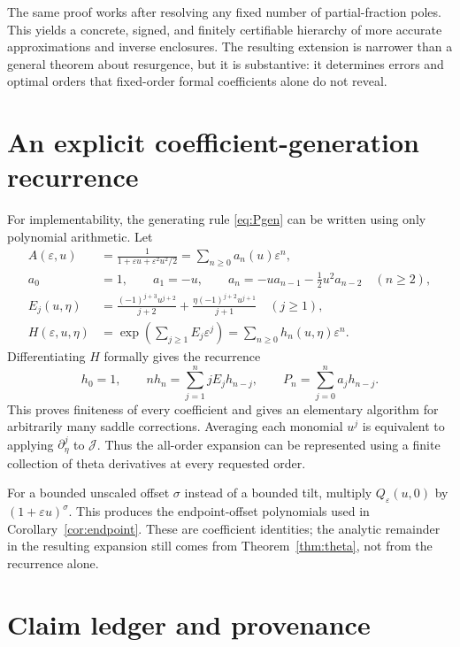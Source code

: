 \documentclass[11pt,a4paper]{article}
\numberwithin{equation}{section}
\theoremstyle{definition}\newtheorem{definition}[theorem]{Definition}
\theoremstyle{remark}\newtheorem{remark}[theorem]{Remark}
\newcommand{\eps}{\varepsilon}
\newcommand{\calJ}{\mathcal J}
\begin{document}
The same proof works after resolving any fixed number of partial-fraction
poles. This yields a concrete, signed, and finitely certifiable hierarchy
of more accurate approximations and inverse enclosures. The resulting
extension is narrower than a general theorem about resurgence, but it is
substantive: it determines errors and optimal orders that fixed-order
formal coefficients alone do not reveal.

\appendix
\section{An explicit coefficient-generation recurrence}
\label{app:recurrence}

For implementability, the generating rule \eqref{eq:Pgen} can be written
using only polynomial arithmetic. Let
\begin{align}
 A(\eps,u)&=\frac1{1+\eps u+\eps^2u^2/2}
             =\sum_{n\ge0}a_n(u)\eps^n,\\
 a_0&=1,\qquad a_1=-u,\qquad
 a_n=-u a_{n-1}-\tfrac12u^2a_{n-2}\quad(n\ge2),\\
 E_j(u,\eta)&=\frac{(-1)^{j+3}u^{j+2}}{j+2}
            +\frac{\eta(-1)^{j+2}u^{j+1}}{j+1}\quad(j\ge1),\\
 H(\eps,u,\eta)&=\exp\left(\sum_{j\ge1}E_j\eps^j\right)
                    =\sum_{n\ge0}h_n(u,\eta)\eps^n.
\end{align}
Differentiating $H$ formally gives the recurrence
\begin{equation}
 h_0=1,\qquad nh_n=\sum_{j=1}^n jE_jh_{n-j},\qquad
 P_n=\sum_{j=0}^n a_jh_{n-j}.
 \label{eq:polyrec}
\end{equation}
This proves finiteness of every coefficient and gives an elementary
algorithm for arbitrarily many saddle corrections. Averaging each
monomial $u^j$ is equivalent to applying $\partial_\eta^j$ to $\calJ$.
Thus the all-order expansion can be represented using a finite collection
of theta derivatives at every requested order.

For a bounded unscaled offset $\sigma$ instead of a bounded tilt, multiply
$Q_\eps(u,0)$ by $(1+\eps u)^\sigma$. This produces the endpoint-offset
polynomials used in Corollary~\ref{cor:endpoint}. These are coefficient
identities; the analytic remainder in the resulting expansion still comes
from Theorem~\ref{thm:theta}, not from the recurrence alone.

\section{Claim ledger and provenance}
\label{app:ledger}
\end{document}

